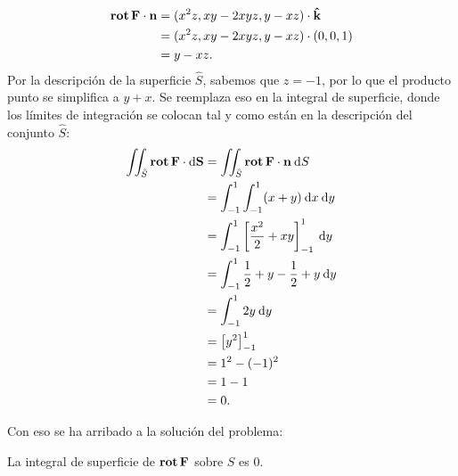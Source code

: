 \documentclass{fmbvecto}
\begin{document}
\begin{problema}
\begin{align*}
        \rot \bvec{F} \cdot \bvec{n} &= (x^2z, xy-2xyz, y-xz) \cdot \uvec{k} \\
        &= (x^2z, xy-2xyz, y-xz) \cdot (0, 0, 1) \\
        &= y-xz.
    \end{align*}
    Por la descripción de la superficie \(\hat{S}\), sabemos que \(z = -1\), por lo que el producto punto se simplifica a \(y+x\). Se reemplaza eso en la integral de superficie, donde los límites de integración se colocan tal y como están en la descripción del conjunto \(\hat{S}\):
    \begin{align*}
        \iint_{\hat{S}} \operatorname{\mathbf{rot}} \boldsymbol{{\mathbf{F}}} \cdot \mathrm{d}\boldsymbol{{\mathbf{S}}} &= \iint_{\hat{S}} \operatorname{\mathbf{rot}} \boldsymbol{{\mathbf{F}}} \cdot \boldsymbol{{\mathbf{n}}} \: \mathrm{d}S \\
        &= \int_{-1}^1 \int_{-1}^1 (x + y) \: \mathrm{d}x \: \mathrm{d}y \\
        &= \int_{-1}^1 \left[ \frac{x^2}{2} + xy \right]_{-1}^1 \: \mathrm{d}y \\
        &= \int_{-1}^1 \frac{1}{2} + y - \frac{1}{2} + y \: \mathrm{d}y \\
        &= \int_{-1}^1 2y \: \mathrm{d}y \\
        &= \left[ y^2 \right]_{-1}^1 \\
        &= 1^2 - (-1)^2 \\
        &= 1 - 1 \\
        &= 0.
    \end{align*}

    Con eso se ha arribado a la solución del problema:
    \begin{gbox}
        La integral de superficie de \(\operatorname{\mathbf{rot}} \boldsymbol{{\mathbf{F}}}\) sobre \(S\) es \(0\).
    \end{gbox}
\end{problema}

\phantom{}
\end{document}
